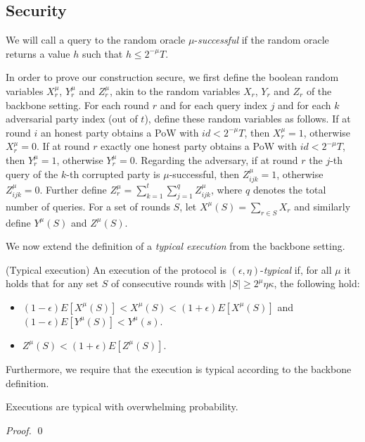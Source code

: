 \subsection{Security}

We will call a query to the random oracle $\mu$-\textit{successful} if the
random oracle returns a value $h$ such that $h \leq 2^{-\mu}T$.

In order to prove our construction secure, we first define the boolean random
variables $X_r^\mu$, $Y_r^\mu$ and $Z_r^\mu$, akin to the random variables
$X_r$, $Y_r$ and $Z_r$ of the backbone setting\cite{backbone}. For each round
$r$ and for each query index $j$ and for each $k$ adversarial party index (out
of $t$), define these random variables as follows.  If at round $i$ an honest
party obtains a PoW with $id < 2^{-\mu}T$, then $X_r^\mu = 1$, otherwise
$X_r^\mu = 0$. If at round $r$ exactly one honest party obtains a PoW with $id <
2^{-\mu}T$, then $Y_r^\mu = 1$, otherwise $Y_r^\mu = 0$. Regarding the
adversary, if at round $r$ the $j$-th query of the $k$-th corrupted party is
$\mu$-successful, then $Z^\mu_{ijk} = 1$, otherwise $Z^\mu_{ijk} = 0$. Further
define $Z^\mu_r = \sum_{k=1}^t \sum_{j=1}^q Z^\mu_{ijk}$, where $q$ denotes the
total number of queries. For a set of rounds $S$, let $X^\mu(S) = \sum_{r \in S}
X_r$ and similarly define $Y^\mu(S)$ and $Z^\mu(S)$.

We now extend the definition of a \textit{typical execution} from the backbone
setting\cite{backbone}.

\begin{definition}{(Typical execution)}
    An execution of the protocol is $(\epsilon, \eta)$-\textit{typical} if, for
    all $\mu$ it holds that for any set $S$ of consecutive rounds with $|S| \geq
    2^\mu \eta\kappa$, the following hold:

    \begin{itemize}
        \item $(1 - \epsilon)E[X^\mu(S)] < X^\mu(S) < (1 + \epsilon)E[X^\mu(S)]$ and $(1 - \epsilon)E[Y^\mu(S)] < Y^\mu(s)$.
        \item $Z^\mu(S) < (1 + \epsilon)E[Z^\mu(S)]$.
    \end{itemize}

    Furthermore, we require that the execution is typical according to the
    backbone definition.
\end{definition}

\begin{theorem}
Executions are typical with overwhelming probability.
\end{theorem}
\begin{proof}
\qed
\end{proof}

